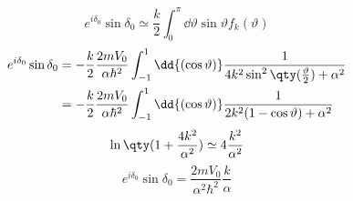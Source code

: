 \begin{soluzione}
{   \begin{equation*}
      e^{i \delta_0} \sin{\delta_0}
      \simeq \frac{k}{2} \int_{0}^{\pi} \dd{\vartheta} \sin{\vartheta} f_k(\vartheta)
   \end{equation*}
   \begin{equation*}
      \begin{split}
         e^{i \delta_0} \sin{\delta_0}
         & =-\frac{k}{2} \frac{2m V_0}{\alpha \hbar^2} \int_{-1}^{1} \dd{(\cos{\vartheta})} \frac{1}{4k^2 \sin^2{\qty( \frac{\vartheta}{2} )} + \alpha^2}
         \\
         & =-\frac{k}{2} \frac{2m V_0}{\alpha \hbar^2} \int_{-1}^{1} \dd{(\cos{\vartheta})} \frac{1}{2k^2 ( 1 - \cos{\vartheta}) + \alpha^2}
      \end{split}
   \end{equation*}
   \begin{equation*}
      \ln\qty( 1 + \frac{4 k^2}{\alpha^2} )
      \simeq 4 \frac{k^2}{\alpha^2}
   \end{equation*}
   \begin{equation*}
      e^{i \delta_0} \sin{\delta_0}
      =\frac{2 m V_0}{\alpha^2 \hbar^2} \frac{k}{\alpha}
   \end{equation*}

   }
\end{soluzione}

\newpage
\setcounter{equation}{0}